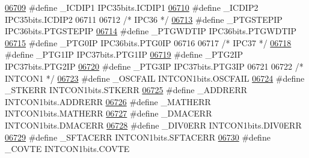 \begin{DoxyCode}
\hypertarget{a00015_source_l06709}{}\hyperlink{a00015_a86b7a2e296397ff1c3bfab86455ede05}{06709} \textcolor{preprocessor}{#define \_ICDIP1 IPC35bits.ICDIP1}
\hypertarget{a00015_source_l06710}{}\hyperlink{a00015_a821e82aacd16a37acf69d22c5ff3630b}{06710} \textcolor{preprocessor}{#define \_ICDIP2 IPC35bits.ICDIP2}
06711 
06712 \textcolor{comment}{/* IPC36 */}
\hypertarget{a00015_source_l06713}{}\hyperlink{a00015_aa8a15abb24650e0c04e57bf1b51075d5}{06713} \textcolor{preprocessor}{#define \_PTGSTEPIP IPC36bits.PTGSTEPIP}
\hypertarget{a00015_source_l06714}{}\hyperlink{a00015_aa70a70554fd1f0cf90b94da6aa97de47}{06714} \textcolor{preprocessor}{#define \_PTGWDTIP IPC36bits.PTGWDTIP}
\hypertarget{a00015_source_l06715}{}\hyperlink{a00015_ae627288eb4b83995faf9c03a15230176}{06715} \textcolor{preprocessor}{#define \_PTG0IP IPC36bits.PTG0IP}
06716 
06717 \textcolor{comment}{/* IPC37 */}
\hypertarget{a00015_source_l06718}{}\hyperlink{a00015_ad3fa5a496a50d47cad23974f3011e527}{06718} \textcolor{preprocessor}{#define \_PTG1IP IPC37bits.PTG1IP}
\hypertarget{a00015_source_l06719}{}\hyperlink{a00015_a29cb8fbd047d4a4ea164e9e98c8959d9}{06719} \textcolor{preprocessor}{#define \_PTG2IP IPC37bits.PTG2IP}
\hypertarget{a00015_source_l06720}{}\hyperlink{a00015_a6b25297c42b156f294317853b2cad562}{06720} \textcolor{preprocessor}{#define \_PTG3IP IPC37bits.PTG3IP}
06721 
06722 \textcolor{comment}{/* INTCON1 */}
\hypertarget{a00015_source_l06723}{}\hyperlink{a00015_ab93b5e4053dc93244f73243b2332ba4b}{06723} \textcolor{preprocessor}{#define \_OSCFAIL INTCON1bits.OSCFAIL}
\hypertarget{a00015_source_l06724}{}\hyperlink{a00015_aa13b1fc6a2a6dd7ca350f0cea5d7e6c8}{06724} \textcolor{preprocessor}{#define \_STKERR INTCON1bits.STKERR}
\hypertarget{a00015_source_l06725}{}\hyperlink{a00015_abb518812d534c811c6e63d68c2ed47d2}{06725} \textcolor{preprocessor}{#define \_ADDRERR INTCON1bits.ADDRERR}
\hypertarget{a00015_source_l06726}{}\hyperlink{a00015_a9e1c315da4f5e9dfea421da45fe2867d}{06726} \textcolor{preprocessor}{#define \_MATHERR INTCON1bits.MATHERR}
\hypertarget{a00015_source_l06727}{}\hyperlink{a00015_ac2069c847121e91f88c01b720d3506e2}{06727} \textcolor{preprocessor}{#define \_DMACERR INTCON1bits.DMACERR}
\hypertarget{a00015_source_l06728}{}\hyperlink{a00015_ab21fadd3446553d0bd7385eb651a1d40}{06728} \textcolor{preprocessor}{#define \_DIV0ERR INTCON1bits.DIV0ERR}
\hypertarget{a00015_source_l06729}{}\hyperlink{a00015_a6cfd50a286b0d7d7586bfe451c974858}{06729} \textcolor{preprocessor}{#define \_SFTACERR INTCON1bits.SFTACERR}
\hypertarget{a00015_source_l06730}{}\hyperlink{a00015_aa801fd12da541242cf281ec999cff0f0}{06730} \textcolor{preprocessor}{#define \_COVTE INTCON1bits.COVTE}

\end{DoxyCode}
